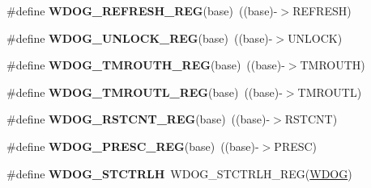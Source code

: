 \begin{DoxyCompactItemize}
\item 
\#define {\bfseries W\+D\+O\+G\+\_\+\+R\+E\+F\+R\+E\+S\+H\+\_\+\+R\+EG}(base)~((base)-\/$>$R\+E\+F\+R\+E\+SH)\hypertarget{group__WDOG__Register__Accessor__Macros_ga3ea0555f4cb61c5280404f2a46b2895d}{}\label{group__WDOG__Register__Accessor__Macros_ga3ea0555f4cb61c5280404f2a46b2895d}

\item 
\#define {\bfseries W\+D\+O\+G\+\_\+\+U\+N\+L\+O\+C\+K\+\_\+\+R\+EG}(base)~((base)-\/$>$U\+N\+L\+O\+CK)\hypertarget{group__WDOG__Register__Accessor__Macros_ga7f3bae362f30d21d2036bc38e216b40a}{}\label{group__WDOG__Register__Accessor__Macros_ga7f3bae362f30d21d2036bc38e216b40a}

\item 
\#define {\bfseries W\+D\+O\+G\+\_\+\+T\+M\+R\+O\+U\+T\+H\+\_\+\+R\+EG}(base)~((base)-\/$>$T\+M\+R\+O\+U\+TH)\hypertarget{group__WDOG__Register__Accessor__Macros_gad347a017205966537d23260e4ad0a7cc}{}\label{group__WDOG__Register__Accessor__Macros_gad347a017205966537d23260e4ad0a7cc}

\item 
\#define {\bfseries W\+D\+O\+G\+\_\+\+T\+M\+R\+O\+U\+T\+L\+\_\+\+R\+EG}(base)~((base)-\/$>$T\+M\+R\+O\+U\+TL)\hypertarget{group__WDOG__Register__Accessor__Macros_ga290f160f7b9f64e2ecec8e752f7ba6a3}{}\label{group__WDOG__Register__Accessor__Macros_ga290f160f7b9f64e2ecec8e752f7ba6a3}

\item 
\#define {\bfseries W\+D\+O\+G\+\_\+\+R\+S\+T\+C\+N\+T\+\_\+\+R\+EG}(base)~((base)-\/$>$R\+S\+T\+C\+NT)\hypertarget{group__WDOG__Register__Accessor__Macros_ga7c32f9835d954eee361e1477d2d4a07c}{}\label{group__WDOG__Register__Accessor__Macros_ga7c32f9835d954eee361e1477d2d4a07c}

\item 
\#define {\bfseries W\+D\+O\+G\+\_\+\+P\+R\+E\+S\+C\+\_\+\+R\+EG}(base)~((base)-\/$>$P\+R\+E\+SC)\hypertarget{group__WDOG__Register__Accessor__Macros_ga112fe0b00030bebececaf5ee470394cc}{}\label{group__WDOG__Register__Accessor__Macros_ga112fe0b00030bebececaf5ee470394cc}

\item 
\#define {\bfseries W\+D\+O\+G\+\_\+\+S\+T\+C\+T\+R\+LH}~W\+D\+O\+G\+\_\+\+S\+T\+C\+T\+R\+L\+H\+\_\+\+R\+EG(\hyperlink{group__WDOG__Peripheral__Access__Layer_gab938901a5fa5443253fc293ebd0399e3}{W\+D\+OG})\hypertarget{group__WDOG__Register__Accessor__Macros_ga682e2c5e771ae99e572597d5a9ee8620}{}\label{group__WDOG__Register__Accessor__Macros_ga682e2c5e771ae99e572597d5a9ee8620}


\end{DoxyCompactItemize}

